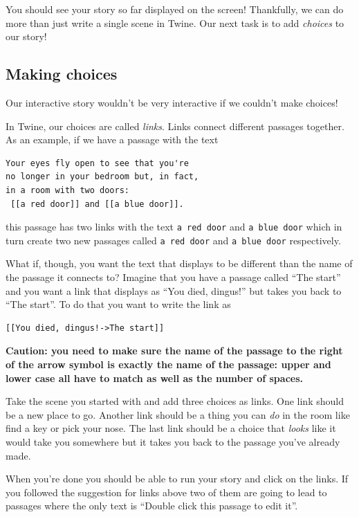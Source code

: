 \documentclass[a5paper,11pt]{article}
\begin{document}
You should see your story so far displayed on the screen! Thankfully, we can do more than just write a single scene in Twine. Our next task is to add \emph{choices} to our story!
\subsection{Making choices}
Our interactive story wouldn't be very interactive if we couldn't make choices!

In Twine, our choices are called \emph{links}. Links connect different passages together. As an example, if we have a passage with the text
\begin{verbatim}
Your eyes fly open to see that you're 
no longer in your bedroom but, in fact, 
in a room with two doors: 
 [[a red door]] and [[a blue door]].
\end{verbatim}
this passage has two links with the text \verb"a red door" and \verb"a blue door" which in turn create two new passages called \verb"a red door" and \verb"a blue door" respectively.

What if, though, you want the text that displays to be different than the name of the passage it connects to? Imagine that you have a passage called ``The start'' and you want a link that displays as ``You died, dingus!'' but takes you back to ``The start''. To do that you want to write the link as
\begin{verbatim}
[[You died, dingus!->The start]]
\end{verbatim}

\textbf{Caution: you need to make sure the name of the passage to the right of the arrow symbol is exactly the name of the passage: upper and lower case all have to match as well as the number of spaces.}

\begin{framed}
  Take the scene you started with and add three choices as links. One link should be a new place to go. Another link should be a thing you can \emph{do} in the room like find a key or pick your nose. The last link should be a choice that \emph{looks} like it would take you somewhere but it takes you back to the passage you've already made. 
\end{framed}

When you're done you should be able to run your story and click on the links. If you followed the suggestion for links above two of them are going to lead to passages where the only text is ``Double click this passage to edit it''.
\end{document}
